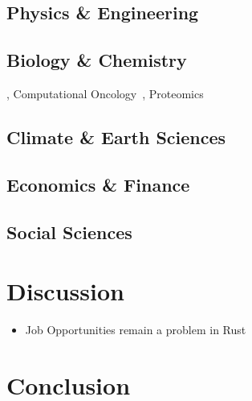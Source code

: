 \documentclass{article}
\begin{document}
\subsection{Physics \& Engineering}
\subsection{Biology \& Chemistry}
\cite{Pleyer2024}, Computational Oncology~\cite{Köster2025}, Proteomics~\cite{Anechitoaie2024}
\subsection{Climate \& Earth Sciences}
\subsection{Economics \& Finance}
\subsection{Social Sciences}

\section{Discussion}
\label{section:discussion}

\begin{itemize}
    \item Job Opportunities remain a problem in Rust
\end{itemize}

\section{Conclusion}
\label{section:conclusion}

\onecolumn
\printbibliography

\pagebreak
{}
\renewcommand{\thesubsection}{S\arabic{supplementSection}}
\newcommand{\supplement}[1]{%
    \stepcounter{supplementSection}%
    \subsection{#1}
}
\renewcommand{\thesection}{}
\end{document}
